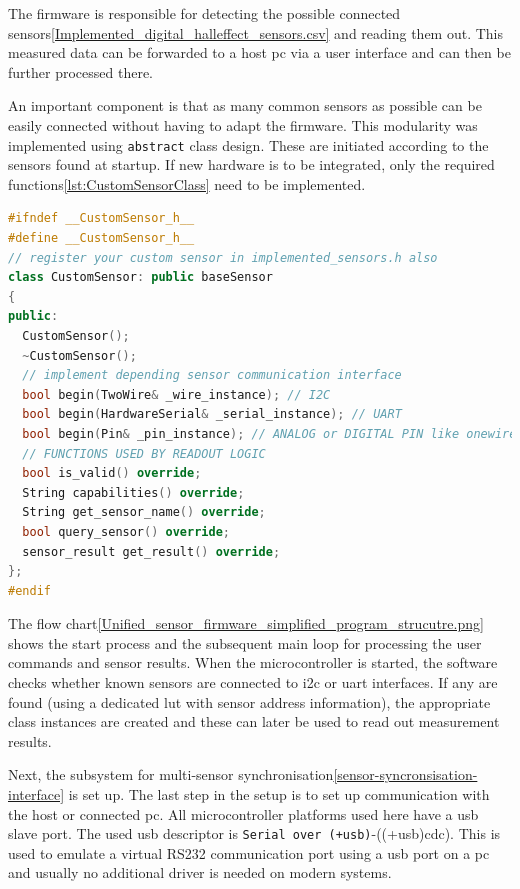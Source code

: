 The firmware is responsible for detecting the possible connected
sensors\ref{Implemented_digital_halleffect_sensors.csv} and reading them
out. This measured data can be forwarded to a host \gls{pc} via a user
interface and can then be further processed there.

An important component is that as many common sensors as possible can be
easily connected without having to adapt the firmware. This modularity
was implemented using \passthrough{\lstinline!abstract!} class design.
These are initiated according to the sensors found at startup. If new
hardware is to be integrated, only the required
functions\ref{lst:CustomSensorClass} need to be implemented.

\begin{lstlisting}[language={C++}, caption={CustomSensor-Class for adding new sensor hardware support}, label=lst:CustomSensorClass]
#ifndef __CustomSensor_h__
#define __CustomSensor_h__
// register your custom sensor in implemented_sensors.h also
class CustomSensor: public baseSensor
{
public:
  CustomSensor();
  ~CustomSensor();
  // implement depending sensor communication interface
  bool begin(TwoWire& _wire_instance); // I2C
  bool begin(HardwareSerial& _serial_instance); // UART
  bool begin(Pin& _pin_instance); // ANALOG or DIGITAL PIN like onewire
  // FUNCTIONS USED BY READOUT LOGIC
  bool is_valid() override;
  String capabilities() override;
  String get_sensor_name() override;
  bool query_sensor() override;
  sensor_result get_result() override;        
};
#endif
\end{lstlisting}

The flow
chart\ref{Unified_sensor_firmware_simplified_program_strucutre.png}
shows the start process and the subsequent main loop for processing the
user commands and sensor results. When the microcontroller is started,
the software checks whether known sensors are connected to \gls{i2c} or
\gls{uart} interfaces. If any are found (using a dedicated \gls{lut}
with sensor address information), the appropriate class instances are
created and these can later be used to read out measurement results.

Next, the subsystem for multi-sensor
synchronisation\ref{sensor-syncronsisation-interface} is set up. The
last step in the setup is to set up communication with the host or
connected \gls{pc}. All microcontroller platforms used here have a
\gls{usb} slave port. The used usb descriptor is
\passthrough{\lstinline!Serial over (+usb)!}-((+usb)\gls{cdc}). This is
used to emulate a virtual RS232 communication port using a \gls{usb}
port on a \gls{pc} and usually no additional driver is needed on modern
systems.


